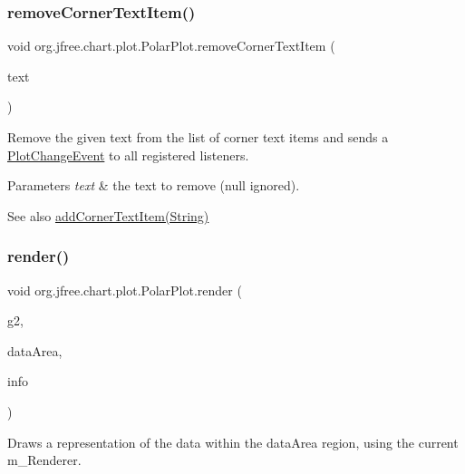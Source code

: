 \subsubsection{\texorpdfstring{remove\+Corner\+Text\+Item()}{removeCornerTextItem()}}
{\footnotesize\ttfamily void org.\+jfree.\+chart.\+plot.\+Polar\+Plot.\+remove\+Corner\+Text\+Item (\begin{DoxyParamCaption}\item[{String}]{text }\end{DoxyParamCaption})}

Remove the given text from the list of corner text items and sends a \mbox{\hyperlink{}{Plot\+Change\+Event}} to all registered listeners.


\begin{DoxyParams}{Parameters}
{\em text} & the text to remove ({\ttfamily null} ignored).\\
\hline
\end{DoxyParams}
\begin{DoxySeeAlso}{See also}
\mbox{\hyperlink{classorg_1_1jfree_1_1chart_1_1plot_1_1_polar_plot_a48f5b157d2780b828d04d10b6b8d9191}{add\+Corner\+Text\+Item(\+String)}} 
\end{DoxySeeAlso}
\mbox{\label{classorg_1_1jfree_1_1chart_1_1plot_1_1_polar_plot_a039a336f4ee16615efa0e312dccbd686}} 
\subsubsection{\texorpdfstring{render()}{render()}}
{\footnotesize\ttfamily void org.\+jfree.\+chart.\+plot.\+Polar\+Plot.\+render (\begin{DoxyParamCaption}\item[{Graphics2D}]{g2,  }\item[{Rectangle2D}]{data\+Area,  }\item[{\mbox{\hyperlink{classorg_1_1jfree_1_1chart_1_1plot_1_1_plot_rendering_info}{Plot\+Rendering\+Info}}}]{info }\end{DoxyParamCaption})\hspace{0.3cm}{\ttfamily [protected]}}

Draws a representation of the data within the data\+Area region, using the current m\+\_\+\+Renderer.


